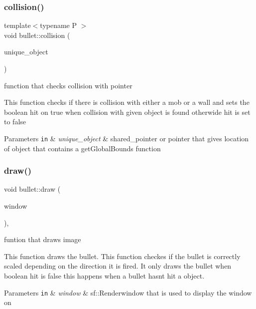\subsubsection{\texorpdfstring{collision()}{collision()}}
{\footnotesize\ttfamily template$<$typename P $>$ \\
void bullet\+::collision (\begin{DoxyParamCaption}\item[{P}]{unique\+\_\+object }\end{DoxyParamCaption})}



function that checks collision with pointer 

This function checks if there is collision with either a mob or a wall and sets the boolean hit on true when collision with given object is found otherwide hit is set to false


\begin{DoxyParams}[1]{Parameters}
\mbox{\tt in}  & {\em unique\+\_\+object} & shared\+\_\+pointer or pointer that gives location of object that contains a get\+Global\+Bounds function \\
\hline
\end{DoxyParams}
\mbox{\label{classbullet_ae999b952538687d45ca2ae54164a5cd8}} 
\subsubsection{\texorpdfstring{draw()}{draw()}}
{\footnotesize\ttfamily void bullet\+::draw (\begin{DoxyParamCaption}\item[{sf\+::\+Render\+Window \&}]{window }\end{DoxyParamCaption})\hspace{0.3cm}{\ttfamily [override]}, {\ttfamily [virtual]}}



funtion that draws image 

This function draws the bullet. This function checkes if the bullet is correctly scaled depending on the direction it is fired. It only draws the bullet when boolean hit is false this happens when a bullet hasn\textquotesingle{}t hit a object.


\begin{DoxyParams}[1]{Parameters}
\mbox{\tt in}  & {\em window} & sf\+::\+Renderwindow that is used to display the window on \\
\hline
\end{DoxyParams}


